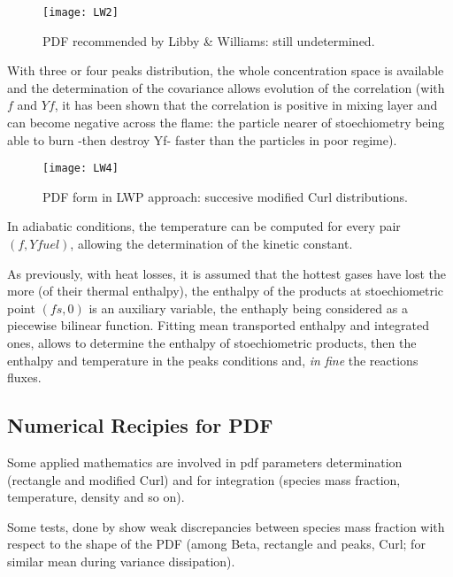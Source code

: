 \begin{figure}[!htpb]
\centerline{\texttt{[image: LW2]}}
\caption{PDF recommended by Libby \& Williams: still undetermined.}
\end{figure}
With three or four peaks distribution, the whole concentration space is
available and the determination of the covariance allows evolution of the
correlation (with $f$ and $Yf$, it has been shown that the correlation is positive
in mixing layer and can become negative across the flame: the
particle nearer of stoechiometry being able to burn -then destroy Yf- faster than the particles in poor regime). \\
\begin{figure}[!htpb]
\centerline{\texttt{[image: LW4]}}
\caption{PDF form in LWP approach: succesive modified Curl distributions.}
\end{figure}

In adiabatic conditions, the temperature can be computed for every pair $(f,Yfuel)$, allowing the determination of the kinetic constant.

As previously, with heat losses, it is assumed that the hottest gases have lost
the more (of their thermal enthalpy), the enthalpy of the products at
stoechiometric point $(fs,0)$ is an auxiliary variable, the enthaply being
considered as a piecewise bilinear function. Fitting mean transported enthalpy
and integrated ones, allows to determine the enthalpy of stoechiometric
products, then the enthalpy and temperature in the peaks conditions and, \emph{in fine} the reactions fluxes.

\subsection{Numerical Recipies for PDF}

Some applied mathematics are involved in pdf parameters determination (rectangle
and modified Curl) and for integration (species
mass fraction, temperature, density and so on).

Some tests, done by \cite{Sapa:2011} show weak discrepancies between species mass
fraction with respect to the shape of the PDF (among Beta, rectangle and peaks,
Curl; for similar mean during variance dissipation).

